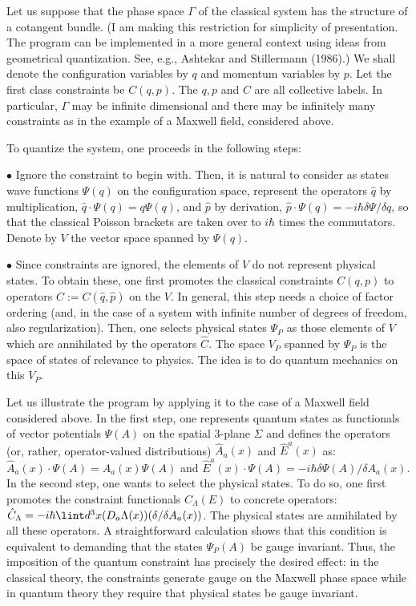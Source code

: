 Let us suppose that the phase space $\Gamma$ of the classical system
has the structure of a cotangent bundle. (I am making this restriction for
simplicity of presentation. The program can be implemented in a more general
context using ideas from geometrical quantization. See, e.g., Ashtekar and
Stillermann (1986).) We shall denote the configuration variables
by $q$ and momentum variables by $p$. Let the first class constraints be
$C(q,p)$. The $q, p$ and $C$ are all collective labels. In particular,
$\Gamma$ may be infinite dimensional and there may be infinitely many
constraints as in the example of a Maxwell field, considered above.

To quantize the system, one proceeds in the following steps:
\item{$\bullet$} Ignore the constraint to begin with. Then, it is natural to
consider as states wave functions $\Psi(q)$ on the configuration space,
represent the operators $\hat{q}$ by multiplication, $\hat{q}\cdot
\Psi (q) = q \Psi(q)$, and $\hat{p}$ by derivation, $\hat{p}\cdot\Psi(q)
= -i{\hbar}\delta\Psi/\delta{q}$, so that the classical Poisson brackets
are taken over to $i\hbar$ times the commutators. Denote by $V$ the vector
space spanned by $\Psi(q)$.
\item{$\bullet$} Since constraints are ignored, the elements of $V$ do not
represent physical states. To obtain these, one first promotes the
classical constraints $C(q,p)$ to operators $\hat{C} := C(\hat{q},
\hat{p})$ on the $V$. In general, this step needs a choice of factor
ordering (and, in the case of a system with infinite number of degrees of
freedom, also regularization). Then, one selects physical states $\Psi_P$
as those elements of $V$ which are annihilated by the operators $\hat{C}$.
The space $V_P$ spanned by $\Psi_P$ is the space of states of relevance
to physics. The idea is to do quantum mechanics on this $V_P$.

Let us illustrate the program by applying it to the case of a Maxwell
field considered above. In the first step, one represents quantum states
as functionals of vector potentials $\Psi (A)$ on the spatial 3-plane
$\Sigma$ and defines the operators (or, rather, operator-valued
distributions) $\hat{A}_a(x)$ and $\hat{E}^a(x)$ as: $\hat{A}_a(x)\cdot
\Psi(A)= A_a(x)\Psi(A)$ and $\hat{E}^a(x)\cdot\Psi(A) = -i\hbar \delta\Psi(A)/
\delta A_a(x)$. In the second step, one wants to select the physical states.
To do so, one first promotes the constraint functionals $C_\Lambda (E)$
to concrete operators: $\hat{C}_\Lambda = -i\hbar\lint d^3x (D_a\Lambda(x))
(\delta/\delta A_a(x))$. The physical states are annihilated by all these
operators. A straightforward calculation shows that this condition is
equivalent to demanding that the states $\Psi_P(A)$ be gauge invariant.
Thus, the imposition of the quantum constraint has precisely the desired
effect: in the classical theory, the constraints generate gauge on the
Maxwell phase space while in quantum theory they require that physical
states be gauge invariant.

